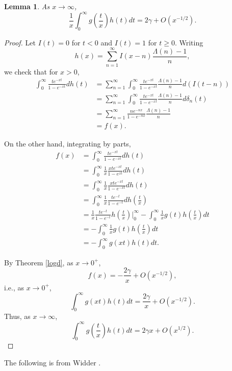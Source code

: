 \documentclass{amsart}
\newtheorem{lemma}[theorem]{Lemma}
\begin{document}
\begin{lemma}
As $x \to \infty$,
\[
\frac{1}{x} \int_0^\infty g\left(\frac{t}{x} \right) h(t) dt = 2\gamma + O(x^{-1/2}).
\]
\end{lemma}
\begin{proof}
Let $I(t)=0$ for $t < 0$ and $I(t)=1$ for $t \geq 0$. Writing
\[
h(x) = \sum_{n=1}^\infty I(x-n)  \frac{\Lambda(n)-1}{n},
\]
we check that for $x>0$,
\begin{align*}
\int_0^\infty \frac{te^{-xt}}{1-e^{-xt}} dh(t)&=\sum_{n=1}^\infty \int_0^\infty 
\frac{te^{-xt}}{1-e^{-xt}}  \frac{\Lambda(n)-1}{n} d(I(t-n))\\
&=\sum_{n=1}^\infty \int_0^\infty 
\frac{te^{-xt}}{1-e^{-xt}}  \frac{\Lambda(n)-1}{n} d\delta_n(t)\\
&=\sum_{n=1}^\infty \frac{ne^{-nx}}{1-e^{-nx}} \frac{\Lambda(n)-1}{n}\\
&=f(x).
\end{align*}

On the other hand, integrating by parts,
\begin{align*}
f(x)&=\int_0^\infty \frac{te^{-xt}}{1-e^{-xt}} dh(t)\\
&=\int_0^\infty \frac{1}{x} \frac{xt e^{-xt}}{1-e^{xt}} dh(t)\\
&=\int_0^\infty \frac{1}{x} \frac{xt e^{-xt}}{1-e^{-xt}} dh(t)\\
&=\int_0^\infty \frac{1}{x} \frac{t e^{-t}}{1-e^{-t}} dh\left(\frac{t}{x}\right)\\
&=\frac{1}{x} \frac{t e^{-t}}{1-e^{-t}} h\left(\frac{t}{x}\right) \bigg|_0^\infty 
- \int_0^\infty \frac{1}{x} g(t) h\left(\frac{t}{x}\right) dt\\
&=-\int_0^\infty \frac{1}{x} g(t) h\left(\frac{t}{x}\right) dt\\
&=-\int_0^\infty g(xt) h(t) dt.
\end{align*}

By Theorem \ref{logd}, as $x \to 0^+$,
\[
f(x) = -\frac{2\gamma}{x} + O(x^{-1/2}),
\]
i.e., as $x \to 0^+$,
\[
\int_0^\infty g(xt) h(t) dt = \frac{2\gamma}{x} + O(x^{-1/2}).
\]
Thus, as $x \to \infty$,
\[
\int_0^\infty g\left(\frac{t}{x} \right) h(t) dt = 2\gamma x + O(x^{1/2}).
\]
\end{proof}

The following is from Widder \cite[p.~232]{widder}.
\end{document}

